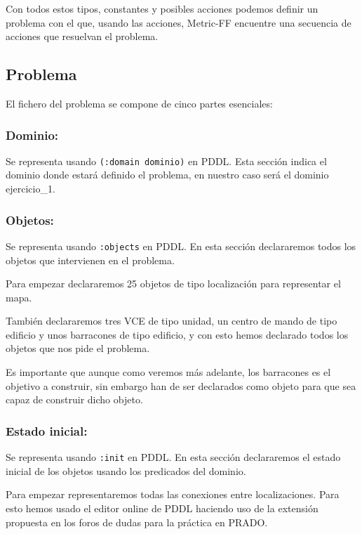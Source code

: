 \documentclass[11pt, spanish]{article}
\begin{document}
Con todos estos tipos, constantes y posibles acciones podemos definir un problema con el que, usando las acciones, Metric-FF encuentre una secuencia de acciones que resuelvan el problema.

\subsection{Problema}

El fichero del problema se compone de cinco partes esenciales:

\subsubsection{Dominio:}

Se representa usando \texttt{(:domain dominio)} en PDDL. Esta sección indica el dominio donde estará definido el problema, en nuestro caso será el dominio ejercicio\_1.

\subsubsection{Objetos:}

Se representa usando \texttt{:objects} en PDDL. En esta sección declararemos todos los objetos que intervienen en el problema.

Para empezar declararemos 25 objetos de tipo localización para representar el mapa.

También declararemos tres VCE de tipo unidad, un centro de mando de tipo edificio y unos barracones de tipo edificio, y con esto hemos declarado todos los objetos que nos pide el problema.

Es importante que aunque como veremos más adelante, los barracones es el objetivo a construir, sin embargo han de ser declarados como objeto para que sea capaz de construir dicho objeto.


\subsubsection{Estado inicial:}

Se representa usando \texttt{:init} en PDDL. En esta sección declararemos el estado inicial de los objetos usando los predicados del dominio.

Para empezar representaremos todas las conexiones entre localizaciones. Para esto hemos usado el editor online de PDDL haciendo uso de la extensión propuesta en los foros de dudas para la práctica en PRADO.
\end{document}
